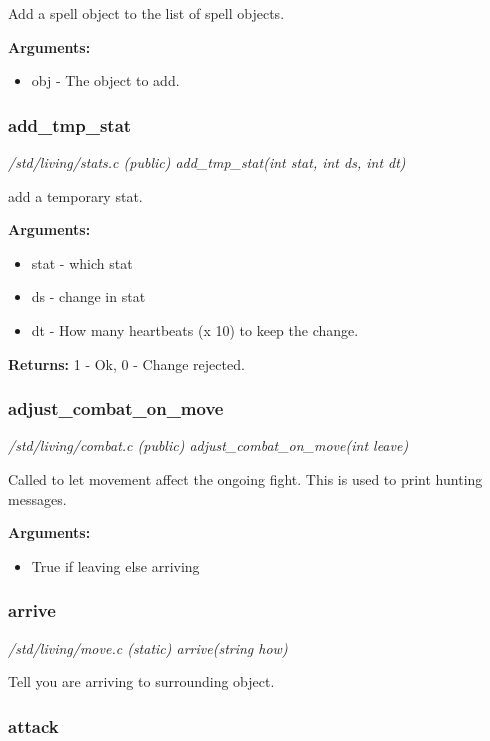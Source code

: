 Add a spell object to the list of spell objects.

{\bf Arguments:}
\begin{itemize}
\item     obj - The object to add.
\end{itemize}


\subsubsection{add\_tmp\_stat}

{\em /std/living/stats.c (public) add\_tmp\_stat(int stat, int ds, int dt)}

add a temporary stat.

{\bf Arguments:}
\begin{itemize}
\item      stat - which stat
\item ds - change in stat
\item dt - How many heartbeats (x 10) to keep the change.
\end{itemize}

{\bf Returns:}        1 - Ok, 0 - Change rejected.


\subsubsection{adjust\_combat\_on\_move}

{\em /std/living/combat.c (public) adjust\_combat\_on\_move(int leave)}

Called to let movement affect the ongoing fight. This
is used to print hunting messages.

{\bf Arguments:}
\begin{itemize}
\item     True if leaving else arriving
\end{itemize}


\subsubsection{arrive}

{\em /std/living/move.c (static) arrive(string how)}

Tell you are arriving to surrounding object.


\subsubsection{attack}

